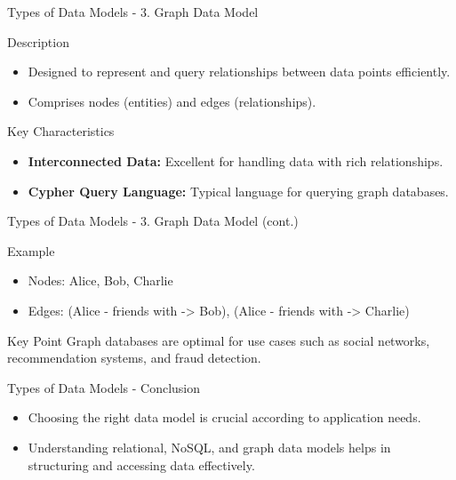 \documentclass[aspectratio=169]{beamer}
\begin{document}
\begin{frame}[fragile]{Types of Data Models - 3. Graph Data Model}
    \begin{block}{Description}
        \begin{itemize}
            \item Designed to represent and query relationships between data points efficiently.
            \item Comprises nodes (entities) and edges (relationships).
        \end{itemize}
    \end{block}

    \begin{block}{Key Characteristics}
        \begin{itemize}
            \item \textbf{Interconnected Data:} Excellent for handling data with rich relationships.
            \item \textbf{Cypher Query Language:} Typical language for querying graph databases.
        \end{itemize}
    \end{block}
\end{frame}

\begin{frame}[fragile]{Types of Data Models - 3. Graph Data Model (cont.)}
    \begin{block}{Example}
        \begin{itemize}
            \item Nodes: Alice, Bob, Charlie
            \item Edges: (Alice - friends with -> Bob), (Alice - friends with -> Charlie)
        \end{itemize}
    \end{block}

    \begin{block}{Key Point}
        Graph databases are optimal for use cases such as social networks, recommendation systems, and fraud detection.
    \end{block}
\end{frame}

\begin{frame}[fragile]{Types of Data Models - Conclusion}
    \begin{itemize}
        \item Choosing the right data model is crucial according to application needs.
        \item Understanding relational, NoSQL, and graph data models helps in structuring and accessing data effectively.
    \end{itemize}
\end{frame}
\end{document}
